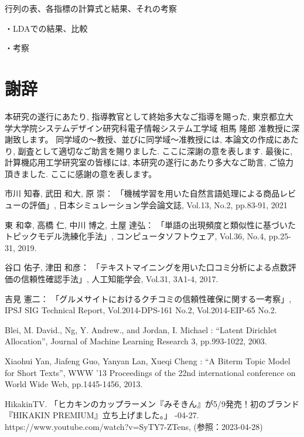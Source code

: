 \documentclass{ltjarticle}
\begin{document}
行列の表、各指標の計算式と結果、それの考察

・LDAでの結果、比較

・考察














\newpage
\part*{謝辞}
本研究の遂行にあたり, 指導教官として終始多大なご指導を賜った, 
東京都立大学大学院システムデザイン研究科電子情報システム工学域 相馬 隆郎 准教授に深謝致します。
同学域の～教授、並びに同学域～准教授には, 本論文の作成にあたり, 副査として適切なご助言を賜りました. ここに深謝の意を表します. 
最後に, 計算機応用工学研究室の皆様には, 本研究の遂行にあたり多大なご助言, ご協力頂きました. ここに感謝の意を表します。

\newpage
\begin{thebibliography}{99}
    市川 知春, 武田 和大, 原 崇：
    \newblock 「機械学習を用いた自然言語処理による商品レビューの評価」, 
    \newblock 日本シミュレーション学会論文誌, Vol.13, No.2, pp.83-91, 2021

    東 和幸, 高橋 仁, 中川 博之, 土屋 達弘：
    \newblock 「単語の出現頻度と類似性に基づいたトピックモデル洗練化手法」, 
    \newblock コンピュータソフトウェア, Vol.36, No.4, pp.25-31, 2019.

    谷口 佑子, 津田 和彦：
    \newblock 「テキストマイニングを用いた口コミ分析による点数評価の信頼性確認手法」, 
    \newblock 人工知能学会, Vol.31, 3A1-4, 2017.

    吉見 憲二：
    \newblock 「グルメサイトにおけるクチコミの信頼性確保に関する一考察」, 
    \newblock IPSJ SIG Technical Report, Vol.2014-DPS-161 No.2, Vol.2014-EIP-65 No.2.   

    Blei, M. David., Ng, Y. Andrew., and Jordan, I. Michael : 
    \newblock ``Latent Dirichlet Allocation'', 
    \newblock Journal of Machine Learning Research 3, pp.993-1022, 2003.

    Xiaohui Yan, Jiafeng Guo, Yanyan Lan, Xueqi Cheng :
    \newblock ``A Biterm Topic Model for Short Texts'', 
    \newblock WWW '13 Proceedings of the 22nd international conference on World Wide Web, pp.1445-1456, 2013.

    HikakinTV. 「ヒカキンのカップラーメン『みそきん』が5/9発売！初のブランド『HIKAKIN PREMIUM』立ち上げました。」
    -04-27. 
    \newblock https://www.youtube.com/watch?v=SyTY7-ZTens, (参照：2023-04-28)

     
\end{thebibliography}
\end{document}
